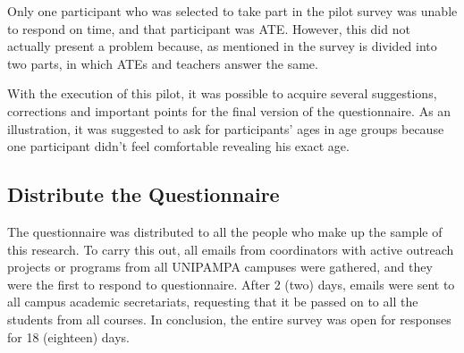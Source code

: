 
Only one participant who was selected to take part in the pilot survey was unable to respond on time, and that participant was \ac{ATE}. However, this did not actually present a problem because, as mentioned in  the survey is divided into two parts, in which \acp{ATE} and teachers answer the same.


With the execution of this pilot, it was possible to acquire several suggestions, corrections and important points for the final version of the questionnaire.
As an illustration, it was suggested to ask for participants' ages in age groups because one participant didn't feel comfortable revealing his exact age.
\subsection{Distribute the Questionnaire}\label{sec:survey-distribute}


The questionnaire was distributed to all the people who make up the sample of this research.
To carry this out, all emails from coordinators with active outreach projects or programs from all \ac{UNIPAMPA} campuses were gathered, and they were the first to respond to questionnaire.
After 2 (two) days, emails were sent to all campus academic secretariats, requesting that it be passed on to all the students from all courses. In conclusion, the entire survey was open for responses for 18 (eighteen) days.

